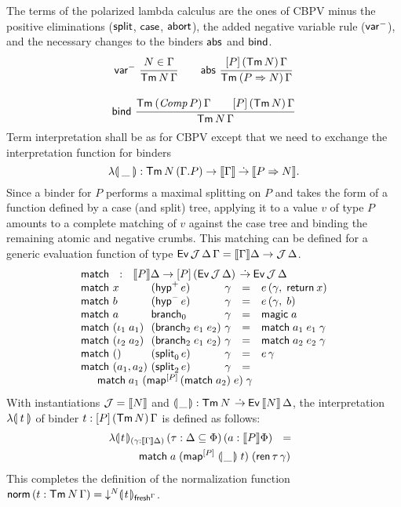 \documentclass[sigconf,screen,fleqn]{acmart} %
\begin{document}
The terms  of the polarized lambda calculus are the
ones of CBPV minus the positive eliminations ($\mathsf{split}$, $\mathsf{case}$,
$\mathsf{abort}$), the added negative variable rule ($\mathsf{var}^{-}$), and the
necessary changes to the binders $\mathsf{abs}$ and $\mathsf{bind}$.
\begin{gather*}
  \nru{\nvar}{N \in \Gamma}{\Tm N \Gamma}
\qquad
  \nru{\tabs}
      {\AddHypP P {\tTm\, N} \Gamma}
      {\TmP {P \To N} \Gamma}
\\[2ex]
  \nru{\tbind}
      {\TmP {\Comp P} \Gamma \qquad \AddHypP P {\tTm\,N} \Gamma}
      {\Tm N \Gamma}
\end{gather*}
Term interpretation
shall be as for CBPV except that we need to exchange the
interpretation function for binders
\[
\fden\_ : \Tm N {(\cext
    \Gamma P)} \to \den \Gamma \todot \den{P \To N}
.\]
Since a binder
for $P$ performs a maximal splitting on $P$ and takes the form of a
function defined by a case (and split) tree,
applying it to a value $v$ of type $P$ amounts to a complete
matching of $v$ against the case tree and binding the remaining
atomic and negative crumbs.  This matching can be defined for a
generic evaluation function of type
$\mathsf{Ev}\,\mathcal{J}\,\Delta\,\Gamma = \mathopen{{[\kern-0.14em[}} \Gamma \mathclose{{]\kern-0.14em]}} \Delta \to \mathcal{J}\,\Delta$.
\[
\begin{array}{l@{~}l@{~}l@{~}lcl}
  \multicolumn 6 {l} {\tmatch ~~:~~ \den P \Delta \to
    \AddHypP P {\Evv \J \Delta} \todot \Evv \J \Delta }\\
  \tmatch & x & (\phyp\,e) & \gamma & = & e\,(\gamma,\; \treturn\,x) \\
  \tmatch & b & (\nhyp\,e) & \gamma & = & e\,(\gamma,\; b) \\
  \tmatch & a & \nbranch & \gamma & = & \tmagic\;a \\
  \tmatch & (\iota_1\;a_1) & (\bbranch\;e_1\;e_2) & \gamma & = &
    \tmatch\;a_1\;e_1\;\gamma \\
  \tmatch & (\iota_2\;a_2) & (\bbranch\;e_1\;e_2) & \gamma & = &
    \tmatch\;a_2\;e_2\;\gamma \\
  \tmatch & \ttempty & (\nsplit\,e) & \gamma & = & e\,\gamma \\
  \tmatch & (a_1,a_2) & (\bsplit\,e) & \gamma & = &
\\ \multicolumn 6 {@{\qquad}l}{
    \tmatch\;a_1\;(\tmap[\Add P]\,(\tmatch\;a_2)\;e)\;\gamma
}
\\
\end{array}
\]
With instantiations $\mathcal{J} = \mathopen{{[\kern-0.14em[}} N \mathclose{{]\kern-0.14em]}}$ and
$\llparenthesis\kern0.3ex\_\kern0.3ex\rrparenthesis : \mathsf{Tm}^{\,}N\,\mathbin{\dot{\to}} \mathsf{Ev}\,\mathopen{{[\kern-0.14em[}} N \mathclose{{]\kern-0.14em]}}\,\Delta$,
the interpretation $\fden t$
of binder $t : [P]\,(\mathsf{Tm}\,N)\,\Gamma$
is defined as follows:
\begin{multline*}
  \lambda\llparenthesis\kern0.3ext\kern0.3ex\rrparenthesis_{(\gamma : \mathopen{{[\kern-0.14em[}} \Gamma \mathclose{{]\kern-0.14em]}} \Delta)}
    \, (\tau : \Delta \subseteq \Phi)
    \, (a : \mathopen{{[\kern-0.14em[}} P \mathclose{{]\kern-0.14em]}} \Phi)
    ~~=~~
\\ \qquad
    \mathsf{match}
      \; a
      \; (\mathsf{map}^{[P]}\;\llparenthesis\kern0.3ex\_\kern0.3ex\rrparenthesis\;t)
      \; (\mathsf{ren}\,\tau\,\gamma)
\end{multline*}
This completes the definition of the normalization function
$\mathsf{norm}\, (t : \mathsf{Tm}^{\,}N\,\Gamma)
  = \mathord{\downarrow_{}^{N}} \llparenthesis\kern0.3ext\kern0.3ex\rrparenthesis_{\mathsf{fresh}^{\Gamma}}$.
\end{document}
